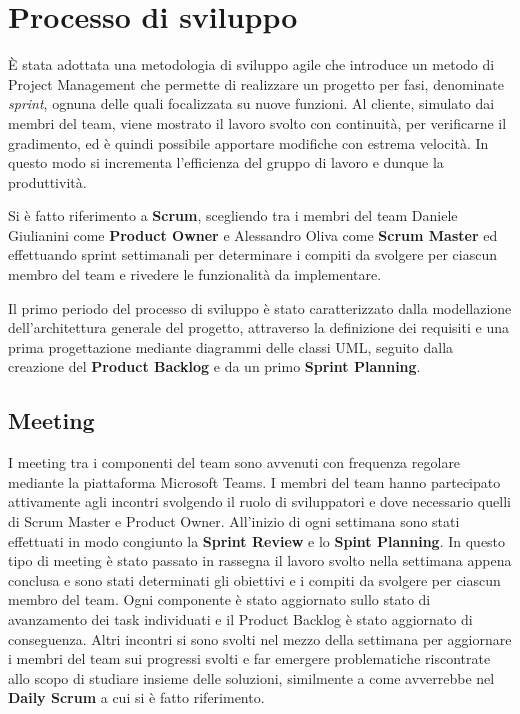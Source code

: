 \section{Processo di sviluppo}
È stata adottata una metodologia di sviluppo agile che introduce un metodo di Project Management che permette di realizzare un progetto per fasi, denominate \textit{sprint}, ognuna delle quali focalizzata su nuove funzioni. Al cliente, simulato dai membri del team, viene mostrato il lavoro svolto con continuità, per verificarne il gradimento, ed è quindi possibile apportare modifiche con estrema velocità. In questo modo si incrementa l’efficienza del gruppo di lavoro e dunque la produttività.

Si è fatto riferimento a \textbf{Scrum}, scegliendo tra i membri del team Daniele Giulianini come \textbf{Product Owner} e Alessandro Oliva come \textbf{Scrum Master} ed effettuando sprint settimanali per determinare i compiti da svolgere per ciascun membro del team e rivedere le funzionalità da implementare.

Il primo periodo del processo di sviluppo è stato caratterizzato dalla modellazione dell'architettura generale del progetto, attraverso la definizione dei requisiti e una prima progettazione mediante diagrammi delle classi UML, seguito dalla creazione del \textbf{Product Backlog} e da un primo \textbf{Sprint Planning}.

\subsection{Meeting}
I meeting tra i componenti del team sono avvenuti con frequenza regolare mediante la piattaforma Microsoft Teams. 
I membri del team hanno partecipato attivamente agli incontri svolgendo il ruolo di sviluppatori e dove necessario quelli di Scrum Master e Product Owner.
All'inizio di ogni settimana sono stati effettuati in modo congiunto la \textbf{Sprint Review} e lo \textbf{Spint Planning}. In questo tipo di meeting è stato passato in rassegna il lavoro svolto nella settimana appena conclusa e sono stati determinati gli obiettivi e i compiti da svolgere per ciascun membro del team. Ogni componente è stato aggiornato sullo stato di avanzamento dei task individuati e il Product Backlog è stato aggiornato di conseguenza. Altri incontri si sono svolti nel mezzo della settimana per aggiornare i membri del team sui progressi svolti e far emergere problematiche riscontrate allo scopo di studiare insieme delle soluzioni, similmente a come avverrebbe nel \textbf{Daily Scrum} a cui si è fatto riferimento.

